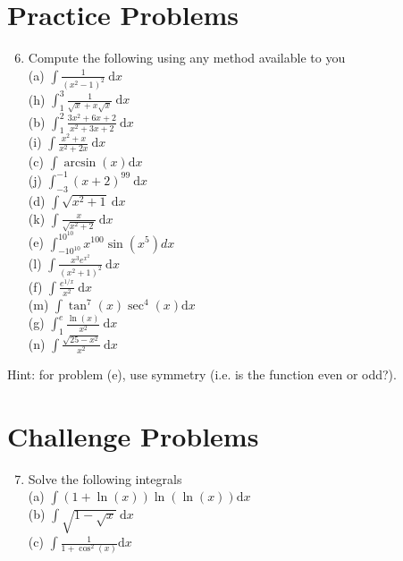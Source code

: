 \documentclass[10pt]{article}
\begin{document}
\section*{Practice Problems}
\begin{enumerate}
  \setcounter{enumi}{5}
  \item Compute the following using any method available to you\\
(a) $\int \frac{1}{\left(x^{2}-1\right)^{2}} \mathrm{~d} x$\\
(h) $\int_{1}^{3} \frac{1}{\sqrt{x}+x \sqrt{x}} \mathrm{~d} x$\\
(b) $\int_{1}^{2} \frac{3 x^{2}+6 x+2}{x^{2}+3 x+2} \mathrm{~d} x$\\
(i) $\int \frac{x^{2}+x}{x^{2}+2 x} \mathrm{~d} x$\\
(c) $\int \arcsin (x) \mathrm{d} x$\\
(j) $\int_{-3}^{-1}(x+2)^{99} \mathrm{~d} x$\\
(d) $\int \sqrt{x^{2}+1} \mathrm{~d} x$\\
(k) $\int \frac{x}{\sqrt{x^{2}+2}} \mathrm{~d} x$\\
(e) $\int_{-10^{10}}^{10^{10}} x^{100} \sin \left(x^{5}\right) d x$\\
(l) $\int \frac{x^{3} e^{x^{2}}}{\left(x^{2}+1\right)^{2}} \mathrm{~d} x$\\
(f) $\int \frac{e^{1 / x}}{x^{2}} \mathrm{~d} x$\\
(m) $\int \tan ^{7}(x) \sec ^{4}(x) \mathrm{d} x$\\
(g) $\int_{1}^{e} \frac{\ln (x)}{x^{2}} \mathrm{~d} x$\\
(n) $\int \frac{\sqrt{25-x^{2}}}{x^{2}} \mathrm{~d} x$
\end{enumerate}

Hint: for problem (e), use symmetry (i.e. is the function even or odd?).

\section*{Challenge Problems}
\begin{enumerate}
  \setcounter{enumi}{6}
  \item Solve the following integrals\\
(a) $\int(1+\ln (x)) \ln (\ln (x)) \mathrm{d} x$\\
(b) $\int \sqrt{1-\sqrt{x}} \mathrm{~d} x$\\
(c) $\int \frac{1}{1+\cos ^{2}(x)} \mathrm{d} x$
\end{enumerate}
\end{document}
